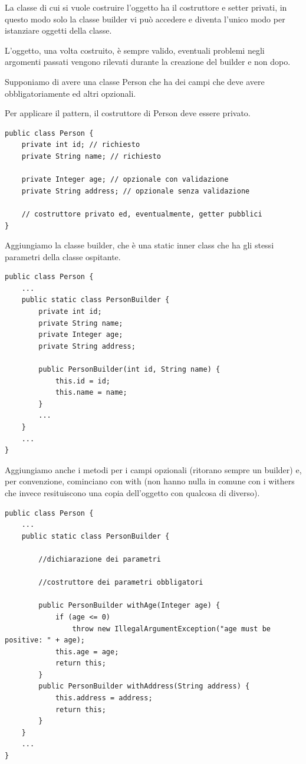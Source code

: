 La classe di cui si vuole costruire l'oggetto ha il costruttore e setter privati, in questo modo solo la classe builder vi può accedere e diventa l’unico modo per 
istanziare oggetti della classe.

L’oggetto, una volta costruito, è sempre valido, eventuali problemi negli argomenti passati vengono rilevati durante la creazione del builder e non dopo.

Supponiamo di avere una classe Person che ha dei campi che deve avere obbligatoriamente ed altri opzionali.

Per applicare il pattern, il costruttore di Person deve essere privato.

\begin{lstlisting}
public class Person {
    private int id; // richiesto
    private String name; // richiesto

    private Integer age; // opzionale con validazione
    private String address; // opzionale senza validazione

    // costruttore privato ed, eventualmente, getter pubblici
}
\end{lstlisting}

Aggiungiamo la classe builder, che è una static inner class che ha gli stessi parametri della classe ospitante.

\begin{lstlisting}
public class Person {
    ...
    public static class PersonBuilder {
        private int id;
        private String name;
        private Integer age;
        private String address;
        
        public PersonBuilder(int id, String name) {
            this.id = id;
            this.name = name;
        }
        ...
    }
    ...
}    
\end{lstlisting}

Aggiungiamo anche i metodi per i campi opzionali (ritorano sempre un builder) e, per convenzione, cominciano con with (non hanno nulla in comune con i withers
che invece resituiscono una copia dell'oggetto con qualcosa di diverso).

\begin{lstlisting}
public class Person {
    ...
    public static class PersonBuilder {
        
        //dichiarazione dei parametri
        
        //costruttore dei parametri obbligatori
        
        public PersonBuilder withAge(Integer age) {
            if (age <= 0)
                throw new IllegalArgumentException("age must be positive: " + age);
            this.age = age;
            return this;
        }
        public PersonBuilder withAddress(String address) {
            this.address = address;
            return this;
        }
    }
    ...
}       
\end{lstlisting}

